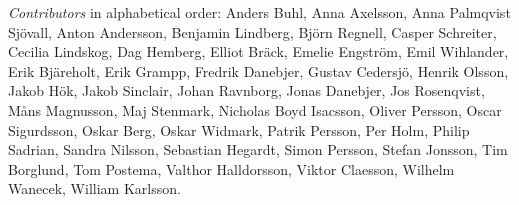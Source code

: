 \emph{Contributors} in alphabetical order:
Anders Buhl,
Anna Axelsson,
Anna Palmqvist Sjövall,
Anton Andersson,
Benjamin Lindberg,
Björn Regnell,
Casper Schreiter,
Cecilia Lindskog,
Dag Hemberg,
Elliot Bräck,
Emelie Engström,
Emil Wihlander,
Erik Bjäreholt,
Erik Grampp,
Fredrik Danebjer,
Gustav Cedersjö,
Henrik Olsson,
Jakob Hök,
Jakob Sinclair,
Johan Ravnborg,
Jonas Danebjer,
Jos Rosenqvist,
Måns Magnusson,
Maj Stenmark,
Nicholas Boyd Isacsson,
Oliver Persson,
Oscar Sigurdsson,
Oskar Berg,
Oskar Widmark,
Patrik Persson,
Per Holm,
Philip Sadrian,
Sandra Nilsson,
Sebastian Hegardt,
Simon Persson,
Stefan Jonsson,
Tim Borglund,
Tom Postema,
Valthor Halldorsson,
Viktor Claesson,
Wilhelm Wanecek,
William Karlsson.

